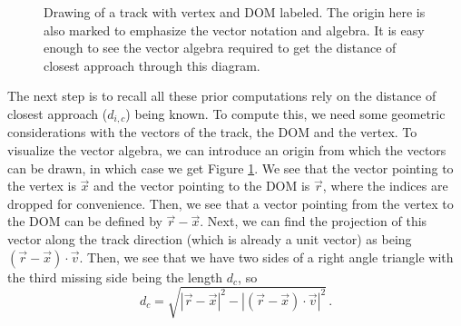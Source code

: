 \begin{figure}
  \centering
  \caption{Drawing of a track with vertex and DOM labeled. The origin here is also marked to emphasize the vector notation and algebra. It is easy enough to see the vector algebra required to get the distance of closest approach through this diagram.}
  \label{fig:dic}
\end{figure}

The next step is to recall all these prior computations rely on the distance of closest approach ($d_{i,c}$) being known. To compute this, we need some geometric considerations with the vectors of the track, the DOM and the vertex. To visualize the vector algebra, we can introduce an origin from which the vectors can be drawn, in which case we get Figure \ref{fig:dic}. We see that the vector pointing to the vertex is $\vec{x}$ and the vector pointing to the DOM is $\vec{r}$, where the indices are dropped for convenience. Then, we see that a vector pointing from the vertex to the DOM can be defined by $\vec{r} - \vec{x}$. Next, we can find the projection of this vector along the track direction (which is already a unit vector) as being $(\vec{r} - \vec{x})\cdot\vec{v}$. Then, we see that we have two sides of a right angle triangle with the third missing side being the length $d_{c}$, so
\begin{equation}
  d_{c} = \sqrt{|\vec{r} - \vec{x}|^{2} - |(\vec{r} - \vec{x})\cdot\vec{v}|^{2}}\, .
\end{equation}

